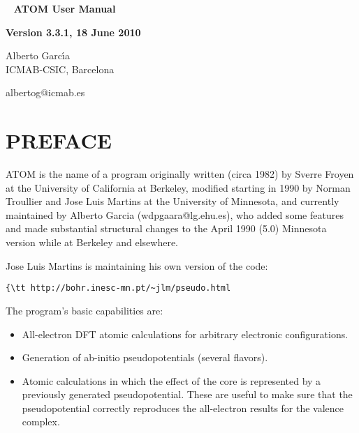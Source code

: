 \documentclass[11pt]{article}
\begin{document}

\begin{titlepage}

\begin{center}
~
\vfill
\vspace{1cm}
{\Huge {\bf ATOM User Manual}}
\par\vspace{3cm}
\hrulefill
\par\vspace{3cm}
{\Large {\bf Version 3.3.1, 18 June 2010}}
\par\vspace{2cm}
\hrulefill

{\Large Alberto Garc\'{\i}a \\
ICMAB-CSIC, Barcelona

albertog@icmab.es}
\vfill
\end{center}

\end{titlepage}

\tableofcontents
\newpage

\section{PREFACE}

{\sc ATOM} is the name of a program originally written (circa 1982) by
Sverre Froyen at the University of California at Berkeley, modified
starting in 1990 by Norman Troullier and Jose Luis Martins at the
University of Minnesota, and currently maintained by Alberto Garcia
(wdpgaara@lg.ehu.es), who added some features and made substantial
structural changes to the April 1990 (5.0) Minnesota version while at
Berkeley and elsewhere.

Jose Luis Martins is maintaining his own version of the code:
\begin{verbatim}{\tt http://bohr.inesc-mn.pt/~jlm/pseudo.html\end{verbatim}


The program's basic capabilities are:

\begin{itemize}
\item All-electron DFT atomic calculations for arbitrary electronic
configurations.

\item Generation of ab-initio pseudopotentials (several flavors).

\item Atomic calculations in which the effect of the core is represented
by a previously generated pseudopotential. These are useful to make
sure that the pseudopotential correctly reproduces the all-electron
results for the valence complex.

\end{itemize}
\end{document}
